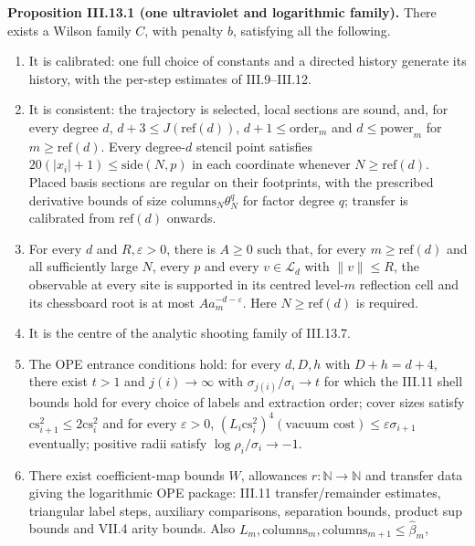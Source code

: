 \documentclass[
  letterpaper,
  11pt]{article}
\providecommand{\tightlist}{%
  \setlength{\itemsep}{0pt}\setlength{\parskip}{0pt}}
\begin{document}
\textbf{Proposition III.13.1 (one ultraviolet and logarithmic family).}
There exists a Wilson family \(C\), with penalty \(b\), satisfying all
the following.

\begin{enumerate}
\def\labelenumi{\arabic{enumi}.}
\tightlist
\item
  It is calibrated: one full choice of constants and a directed history
  generate its history, with the per-step estimates of III.9--III.12.
\item
  It is consistent: the trajectory is selected, local sections are
  sound, and, for every degree \(d\), \(d+3\le J(\mathrm{ref}(d))\),
  \(d+1\le\mathrm{order}_m\) and \(d\le\mathrm{power}_m\) for
  \(m\ge\mathrm{ref}(d)\). Every degree-\(d\) stencil point satisfies
  \(20(|x_i|+1)\le\mathrm{side}(N,p)\) in each coordinate whenever
  \(N\ge\mathrm{ref}(d)\). Placed basis sections are regular on their
  footprints, with the prescribed derivative bounds of size
  \(\mathrm{columns}_N\theta_N^q\) for factor degree \(q\); transfer is
  calibrated from \(\mathrm{ref}(d)\) onwards.
\item
  For every \(d\) and \(R,\varepsilon>0\), there is \(A\ge0\) such that,
  for every \(m\ge\mathrm{ref}(d)\) and all sufficiently large \(N\),
  every \(p\) and every \(v\in\mathcal L_d\) with \(\|v\|\le R\), the
  observable at every site is supported in its centred level-\(m\)
  reflection cell and its chessboard root is at most
  \(Aa_m^{-d-\varepsilon}\). Here \(N\ge\mathrm{ref}(d)\) is required.
\item
  It is the centre of the analytic shooting family of III.13.7.
\item
  The OPE entrance conditions hold: for every \(d,D,h\) with
  \(D+h=d+4\), there exist \(t>1\) and \(j(i)\to\infty\) with
  \(\sigma_{j(i)}/\sigma_i\to t\) for which the III.11 shell bounds hold
  for every choice of labels and extraction order; cover sizes satisfy
  \(\mathrm{cs}_{i+1}^2\le2\mathrm{cs}_i^2\) and for every
  \(\varepsilon>0\),
  \((L_i\mathrm{cs}_i^2)^4(\text{vacuum cost})\le\varepsilon\sigma_{i+1}\)
  eventually; positive radii satisfy \(\log\rho_i/\sigma_i\to-1\).
\item
  There exist coefficient-map bounds \(W\), allowances
  \(r:\mathbb N\to\mathbb N\) and transfer data giving the logarithmic
  OPE package: III.11 transfer/remainder estimates, triangular label
  steps, auxiliary comparisons, separation bounds, product sup bounds
  and VII.4 arity bounds. Also
  \(L_m,\mathrm{columns}_m,\mathrm{columns}_{m+1}\le\hat\beta_m\),

\end{enumerate}
\end{document}
